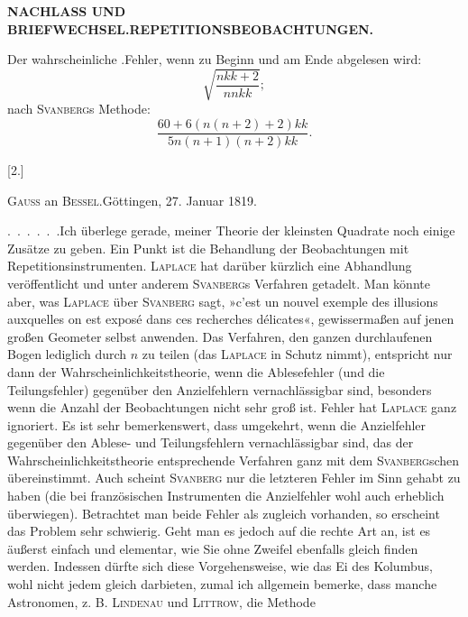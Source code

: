 \par\clearpage
\noindent\null\hfill{\small\textbf{NACHLASS UND BRIEFWECHSEL.\quad REPETITIONSBEOBACHTUNGEN.}}\hfill{}\par\medskip
\par\noindent\hspace*{\parindent}Der wahrscheinliche .Fehler, wenn  zu Beginn und am Ende abgelesen wird:
\[
\sqrt{\frac{nkk+2}{nnkk}};
\]
\noindent nach \textsc{Svanberg}s Methode:
\[
\frac{60+6(n(n+2)+2)kk}{5n(n+1)(n+2)kk}.
\]
\begin{center}\vspace{.7cm}[2.]\par\bigskip
{\large\textsc{Gauss} an \textsc{Bessel}.\quad Göttingen, 27. Januar 1819.}\end{center}
\par\noindent\hspace*{\parindent}.\ .\ .\ .\ .\ .\enspace Ich überlege gerade, meiner Theorie der kleinsten Quadrate noch einige Zusätze zu geben. Ein Punkt ist die Behandlung der Beobachtungen mit Repetitionsinstrumenten. \textsc{Laplace} hat darüber kürzlich eine Abhandlung veröffentlicht und unter anderem \textsc{Svanberg}s Verfahren getadelt. Man könnte aber, was \textsc{Laplace} über \textsc{Svanberg} sagt, »c’est un nouvel exemple des illusions auxquelles on est exposé dans ces recherches délicates«, gewissermaßen auf jenen großen Geometer selbst anwenden. Das Verfahren, den ganzen durchlaufenen Bogen lediglich durch $n$ zu teilen (das \textsc{Laplace} in Schutz nimmt), entspricht nur dann der Wahrscheinlichkeitstheorie, wenn die Ablesefehler (und die Teilungsfehler) gegenüber den Anzielfehlern vernachlässigbar sind, besonders wenn die Anzahl der Beobachtungen nicht sehr groß ist.  Fehler hat \textsc{Laplace} ganz ignoriert. Es ist sehr bemerkenswert, dass umgekehrt, wenn die Anzielfehler gegenüber den Ablese- und Teilungsfehlern vernachlässigbar sind, das der Wahrscheinlichkeitstheorie entsprechende Verfahren ganz mit dem \textsc{Svanberg}schen übereinstimmt. Auch scheint \textsc{Svanberg} nur die letzteren Fehler im Sinn gehabt zu haben (die bei französischen Instrumenten die Anzielfehler wohl auch erheblich überwiegen). Betrachtet man beide Fehler als zugleich vorhanden, so erscheint das Problem sehr schwierig. Geht man es jedoch auf die rechte Art an, ist es äußerst einfach und elementar, wie Sie ohne Zweifel ebenfalls gleich finden werden. Indessen dürfte sich diese Vorgehensweise, wie das Ei des Kolumbus, wohl nicht jedem gleich darbieten, zumal ich allgemein bemerke, dass manche Astronomen, z. B. \textsc{Lindenau} und \textsc{Littrow}, die Methode
\par\medskip\noindent\makebox[.86\linewidth][r]{65\textsuperscript{*}}\par

